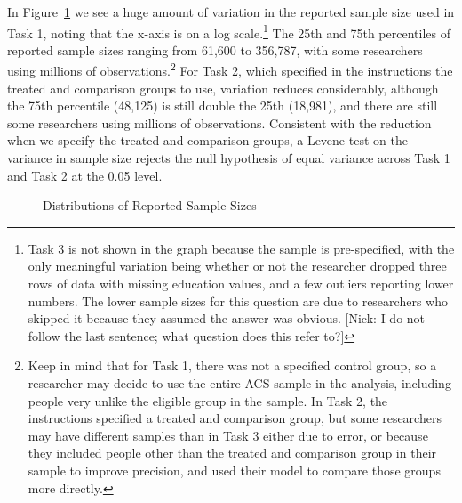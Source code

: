 \documentclass[
  letterpaper,
  DIV=11,
  numbers=noendperiod]{scrartcl}
\begin{document}
In Figure~\ref{fig-sample-size-distributions} we see a huge amount of
variation in the reported sample size used in Task 1, noting that the
x-axis is on a log scale.\footnote{Task 3 is not shown in the graph
  because the sample is pre-specified, with the only meaningful
  variation being whether or not the researcher dropped three rows of
  data with missing education values, and a few outliers reporting lower
  numbers. The lower sample sizes for this question are due to
  researchers who skipped it because they assumed the answer was
  obvious. {[}Nick: I do not follow the last sentence; what question
  does this refer to?{]}} The 25th and 75th percentiles of reported
sample sizes ranging from 61,600 to 356,787, with some researchers using
millions of observations.\footnote{Keep in mind that for Task 1, there
  was not a specified control group, so a researcher may decide to use
  the entire ACS sample in the analysis, including people very unlike
  the eligible group in the sample. In Task 2, the instructions
  specified a treated and comparison group, but some researchers may
  have different samples than in Task 3 either due to error, or because
  they included people other than the treated and comparison group in
  their sample to improve precision, and used their model to compare
  those groups more directly.} For Task 2, which specified in the
instructions the treated and comparison groups to use, variation reduces
considerably, although the 75th percentile (48,125) is still double the
25th (18,981), and there are still some researchers using millions of
observations. Consistent with the reduction when we specify the treated
and comparison groups, a Levene test on the variance in sample size
rejects the null hypothesis of equal variance across Task 1 and Task 2
at the 0.05 level.

\begin{figure}


\caption{\label{fig-sample-size-distributions}Distributions of Reported
Sample Sizes}

\end{figure}%
\end{document}
